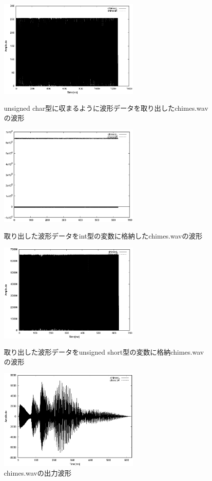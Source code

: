 \documentclass[titlepage]{jarticle}
\begin{document}
\begin{figure}[H]
  \begin{minipage}{0.495\hsize}
    \centering
    \includegraphics[width=7cm]{EPS/chimes_char.eps}
    \caption{unsigned char型に収まるように波形データを取り出したchimes.wavの波形}
    \label{chimes_char}
  \end{minipage}
  \begin{minipage}{0.495\hsize}
    \centering
    \includegraphics[width=7cm]{EPS/chimes_int.eps}
    \caption{取り出した波形データをint型の変数に格納したchimes.wavの波形}
    \label{chimes_int}
  \end{minipage}
  \begin{minipage}{0.495\hsize}
    \centering
    \includegraphics[width=7cm]{EPS/chimes_uShort.eps}
    \caption{取り出した波形データをunsigned short型の変数に格納chimes.wavの波形}
    \label{chimes_uShort}
  \end{minipage}
  \begin{minipage}{0.495\hsize}
    \centering
    \includegraphics[width=7cm]{EPS/chimes.eps}
    \caption{chimes.wavの出力波形}
    \label{chimes.wav}
  \end{minipage}
\end{figure}
\end{document}
